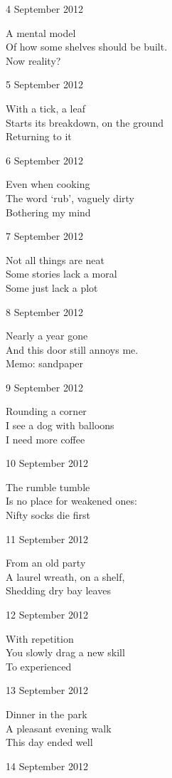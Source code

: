 \documentclass[12pt]{article}
\begin{document}
4 September 2012

A mental model \\
Of how some shelves should be built. \\
Now reality?

5 September 2012

With a tick, a leaf \\
Starts its breakdown, on the ground \\
Returning to it

6 September 2012

Even when cooking \\
The word `rub', vaguely dirty \\
Bothering my mind

7 September 2012

Not all things are neat \\
Some stories lack a moral \\
Some just lack a plot

8 September 2012

Nearly a year gone \\
And this door still annoys me. \\
Memo: sandpaper

9 September 2012

Rounding a corner \\
I see a dog with balloons \\
I need more coffee

\newpage

10 September 2012

The rumble tumble \\
Is no place for weakened ones: \\
Nifty socks die first

11 September 2012

From an old party \\
A laurel wreath, on a shelf, \\
Shedding dry bay leaves

12 September 2012

With repetition \\
You slowly drag a new skill \\
To experienced

13 September 2012

Dinner in the park \\
A pleasant evening walk \\
This day ended well

14 September 2012
\end{document}
